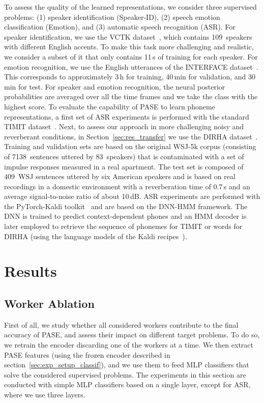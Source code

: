 \documentclass[a4paper]{article}
\begin{document}
To assess the quality of the learned representations, we consider three supervised problems: (1) speaker identification (Speaker-ID), (2) speech emotion classification (Emotion), and (3) automatic speech recognition (ASR). 
For speaker identification, we use the VCTK dataset~\cite{veaux2016superseded}, which contains 109~speakers with different English accents. To make this task more challenging and realistic, we consider a subset of it that only contains 11\,s of training for each speaker.
For emotion recognition, we use the English utterances of the INTERFACE dataset~\cite{hozjan2002interface}.
This corresponds to approximately 3\,h for training, 40\,min for validation, and 30\,min for test. For speaker and emotion recognition, the neural posterior probabilities are averaged over all the time frames and we take the class with the highest score.
To evaluate the capability of PASE to learn phoneme representations, a first set of ASR experiments is performed with the standard TIMIT dataset~\cite{timit}. Next, to assess our approach in more challenging noisy and reverberant conditions, in Section~\ref{sec:res_transfer} we use the DIRHA dataset~\cite{dirha_asru}. 
Training and validation sets are based on the original WSJ-5k corpus (consisting of 7138~sentences uttered by 83~speakers) that is contaminated with a set of impulse responses  measured in a real apartment.  The test set is composed of 409~WSJ sentences uttered by six American speakers and is based on real recordings in a domestic environment with a reverberation time of 0.7\,s and an average signal-to-noise ratio of about 10\,dB. ASR experiments are performed with the PyTorch-Kaldi toolkit~\cite{pytorch_kaldi} and are based on the DNN-HMM framework. The DNN is trained to predict context-dependent phones and an HMM decoder is later employed to retrieve the sequence of phonemes for TIMIT or words for DIRHA (using the language models of the Kaldi recipes~\cite{kaldi_short}). 

\section{Results}
\label{sec:res}

\subsection{Worker Ablation}

First of all, we study whether all considered workers contribute to the final accuracy of PASE, and assess their impact on different target problems. To do so, we retrain the encoder discarding one of the workers at a time. We then extract PASE features (using the frozen encoder described in section~\ref{sec:exp_setup_classif}), and we use them to feed MLP classifiers that solve the considered supervised problems. The experiments in this section are conducted with simple MLP classifiers based on a single layer, except for ASR, where we use three layers. 
\end{document}
